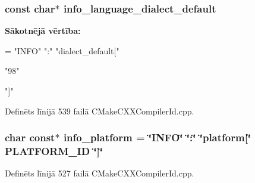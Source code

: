 \subsubsection[{\texorpdfstring{info\+\_\+language\+\_\+dialect\+\_\+default}{info_language_dialect_default}}]{\setlength{\rightskip}{0pt plus 5cm}const char$\ast$ info\+\_\+language\+\_\+dialect\+\_\+default}\hypertarget{cmake-build-release_2_c_make_files_23_810_82_2_compiler_id_c_x_x_2_c_make_c_x_x_compiler_id_8cpp_a1ce162bad2fe6966ac8b33cc19e120b8}{}\label{cmake-build-release_2_c_make_files_23_810_82_2_compiler_id_c_x_x_2_c_make_c_x_x_compiler_id_8cpp_a1ce162bad2fe6966ac8b33cc19e120b8}
{\bfseries Sākotnējā vērtība\+:}
\begin{DoxyCode}
= \textcolor{stringliteral}{"INFO"} \textcolor{stringliteral}{":"} \textcolor{stringliteral}{"dialect\_default["}







  \textcolor{stringliteral}{"98"}

\textcolor{stringliteral}{"]"}
\end{DoxyCode}


Definēts līnijā 539 failā C\+Make\+C\+X\+X\+Compiler\+Id.\+cpp.

\subsubsection[{\texorpdfstring{info\+\_\+platform}{info_platform}}]{\setlength{\rightskip}{0pt plus 5cm}char const$\ast$ info\+\_\+platform = \char`\"{}I\+N\+FO\char`\"{} \char`\"{}\+:\char`\"{} \char`\"{}platform\mbox{[}\char`\"{} P\+L\+A\+T\+F\+O\+R\+M\+\_\+\+ID \char`\"{}\mbox{]}\char`\"{}}\hypertarget{cmake-build-release_2_c_make_files_23_810_82_2_compiler_id_c_x_x_2_c_make_c_x_x_compiler_id_8cpp_a2321403dee54ee23f0c2fa849c60f7d4}{}\label{cmake-build-release_2_c_make_files_23_810_82_2_compiler_id_c_x_x_2_c_make_c_x_x_compiler_id_8cpp_a2321403dee54ee23f0c2fa849c60f7d4}


Definēts līnijā 527 failā C\+Make\+C\+X\+X\+Compiler\+Id.\+cpp.

